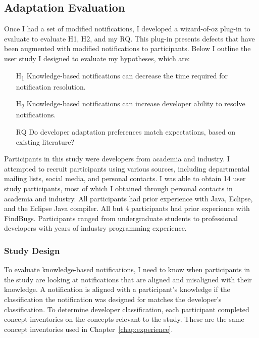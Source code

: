 \subsection{Adaptation Evaluation}

Once I had a set of modified notifications, I developed a wizard-of-oz plug-in to evaluate to evaluate H1, H2, and my RQ. This plug-in presents defects that have been augmented with modified notifications to participants. Below I outline the user study I designed to evaluate my hypotheses, which are:

\begin{itemize}
    \item [H\textsubscript{1}] Knowledge-based notifications can decrease the time required for notification resolution.
    \item [H\textsubscript{2}] Knowledge-based notifications can increase developer ability to resolve notifications.
    \item[RQ] Do developer adaptation preferences match expectations, based on existing literature?
\end{itemize}


Participants in this study were developers from academia and industry. 
I attempted to recruit participants using various sources, including departmental mailing lists, social media, and personal contacts.
I was able to obtain 14 user study participants, most of which I obtained through personal contacts in academia and industry.
All participants had prior experience with Java, Eclipse, and the Eclipse Java compiler. All but 4 participants had prior experience with FindBugs. 
Participants ranged from undergraduate students to professional developers with years of industry programming experience.

\subsubsection{Study Design}

To evaluate knowledge-based notifications, I need to know when participants in  the study are looking at notifications that are aligned and misaligned with their knowledge. A notification is aligned with a participant's knowledge if the classification the notification was designed for matches the developer's classification. To determine developer classification, each participant completed concept inventories on the concepts relevant to the study. These are the same concept inventories used in Chapter~\ref{chap:experience}.

